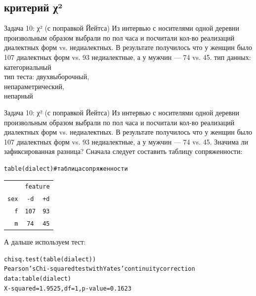 \subsection{критерий χ²}
\begin{frame}{Задача 10: χ² (с поправкой Йейтса)}
Из интервью с носителями одной деревни произвольным образом выбрали по пол часа и посчитали кол-во реализаций диалектных форм vs. недиалектных. В результате получилось что у женщин было 107 диалектных форм vs. 93 недиалектные, а у мужчин  — 74 vs. 45.
\vfill
тип данных: категориальный\\
тип теста: двухвыборочный,\\
непараметрический,\\
непарный
\end{frame}
\begin{frame}{Задача 10: χ² (с поправкой Йейтса)}
Из интервью с носителями одной деревни произвольным образом выбрали по пол часа и посчитали кол-во реализаций диалектных форм vs. недиалектных. В результате получилось что у женщин было 107 диалектных форм vs. 93 недиалектные, а у мужчин  — 74 vs. 45. Значима ли зафиксированная разница?
\vfill
Сначала следует составить таблицу сопряженности:
\scriptsize
\begin{alltt}
\alert{table(dialect)}\hfill \# таблица сопряженности\medskip\\
\begin{tabular}{rcc}
 & \multicolumn{ 2}{c}{feature} \\ 
sex & -d & +d \\ 
f & 107 & 93 \\ 
m & 74 & 45 \\ 
\end{tabular}
\end{alltt}
\normalsize
А дальше используем тест:
\scriptsize
\begin{alltt}
\alert{chisq.test(table(dialect))}\medskip\\
Pearson's Chi-squared test with Yates' continuity correction\\
data:  table(dialect)\\
\alert{X-squared = 1.9525, df = 1, p-value = 0.1623}
\end{alltt}
\normalsize
\end{frame}
